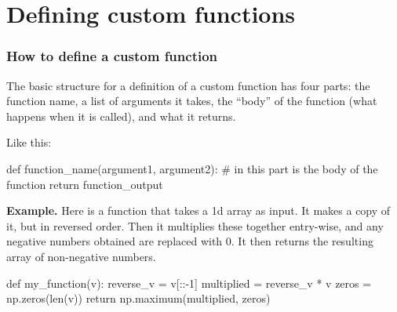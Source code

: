 \documentclass{beamer}
\newenvironment{codeblock}
    {\hfill\begin{beamerboxesrounded}[lower=codecol, width=0.8\textwidth]
    \medskip

    }
    { 
    \end{beamerboxesrounded}\hfill
    }
\theoremstyle{example}
\begin{document}
\section{Defining custom functions}


\begin{frame}[fragile]
    \frametitle{How to define a custom function}
The basic structure for a definition of a custom function has four parts: the function name, a list of arguments it takes, the ``body'' of the function (what happens when it is called), and what it returns.

Like this:

\begin{codeblock}

    \begin{python}
    def function_name(argument1, argument2):
        # in this part is the body of the function
        return function_output
    \end{python}
    
    \end{codeblock}
    

\textbf{Example.} Here is a function that takes a 1d array as input. It makes a copy of it, but in reversed order.  Then it multiplies these together entry-wise, and any negative numbers obtained are replaced with 0. It then returns the resulting array of non-negative numbers.

\begin{codeblock}

\begin{python}
def my_function(v):
    reverse_v = v[::-1]
    multiplied = reverse_v * v
    zeros = np.zeros(len(v))
    return np.maximum(multiplied, zeros)
\end{python}

\end{codeblock}

\end{frame}
\end{document}
